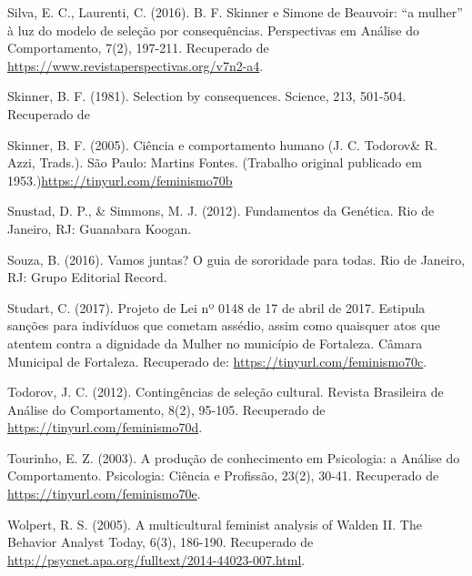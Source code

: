 \hangindent=25pt
\noindent Silva, E. C., Laurenti, C. (2016). B. F. Skinner e Simone de Beauvoir: “a mulher” à luz do modelo de seleção por consequências. Perspectivas em Análise do Comportamento, 7(2), 197-211. Recuperado de \url{https://www.revistaperspectivas.org/v7n2-a4}.

\hangindent=25pt
\noindent Skinner, B. F. (1981). Selection by consequences. Science, 213, 501-504. Recuperado de 

\hangindent=25pt
\noindent Skinner, B. F. (2005). Ciência e comportamento humano (J. C. Todorov\& R. Azzi, Trads.). São Paulo: Martins Fontes. (Trabalho original publicado em 1953.)\url{https://tinyurl.com/feminismo70b}

\hangindent=25pt
\noindent Snustad, D. P., \& Simmons, M. J. (2012). Fundamentos da Genética. Rio de Janeiro, RJ: Guanabara Koogan.

\hangindent=25pt
\noindent Souza, B. (2016). Vamos juntas? O guia de sororidade para todas. Rio de Janeiro, RJ: Grupo Editorial Record. 

\hangindent=25pt
\noindent Studart, C. (2017). Projeto de Lei nº 0148 de 17 de abril de 2017. Estipula sanções para indivíduos que cometam assédio, assim como quaisquer atos que atentem contra a dignidade da Mulher no município de Fortaleza. Câmara Municipal de Fortaleza. Recuperado de: \url{https://tinyurl.com/feminismo70c}.

\hangindent=25pt
\noindent Todorov, J. C. (2012). Contingências de seleção cultural. Revista Brasileira de Análise do Comportamento, 8(2), 95-105. Recuperado de \url{https://tinyurl.com/feminismo70d}.

\hangindent=25pt
\noindent Tourinho, E. Z. (2003). A produção de conhecimento em Psicologia: a Análise do Comportamento. Psicologia: Ciência e Profissão, 23(2), 30-41. Recuperado de \url{https://tinyurl.com/feminismo70e}.

\hangindent=25pt
\noindent Wolpert, R. S. (2005). A multicultural feminist analysis of Walden II. The Behavior Analyst Today, 6(3), 186-190. Recuperado de \url{http://psycnet.apa.org/fulltext/2014-44023-007.html}.